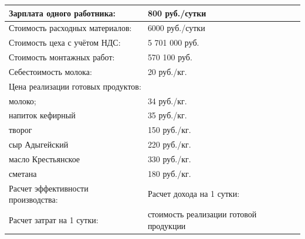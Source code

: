 \begin{table}[]
\begin{tabularx}{\textwidth}{|p{8.05cm}|p{8.05cm}|}
		Зарплата одного работника:                                              & 800 руб./сутки                                                      \\ \hline
		Стоимость расходных материалов:                                         & 6000 руб./сутки                                                     \\ \hline
		Стоимость цеха с учётом НДС:                                            & 5 701 000 руб.                                                      \\ \hline
		Стоимость монтажных работ:                                              & 570 100 руб.                                                        \\ \hline
		Себестоимость молока:                                                   & 20 руб./кг.                                                         \\ \hline
		\multicolumn{2}{|l|}{Цена реализации готовых продуктов:}                                                                                      \\ \hline
		молоко;                                                                 & 34 руб./кг.                                                         \\ \hline
		напиток кефирный                                                        & 35 руб./кг.                                                         \\ \hline
		творог                                                                  & 150 руб./кг.                                                        \\ \hline
		сыр Адыгейский                                                          & 220 руб./кг.                                                        \\ \hline
		масло Крестьянское                                                      & 330 руб./кг.                                                        \\ \hline
		сметана                                                                 & 180 руб./кг.                                                        \\ \hline
		Расчет эффективности производства:                                      & Расчет дохода на 1 сутки:                                           \\ \hline
		Расчет затрат на 1 сутки:                                               & стоимость реализации готовой продукции                              \\ \hline

\end{tabularx}
\end{table}
